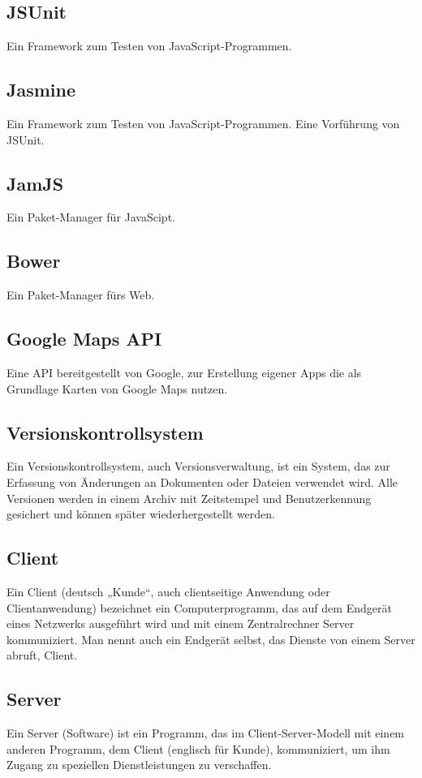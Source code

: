 \documentclass[11pt,a4paper]{article}
\begin{document}
\subsection{JSUnit} Ein Framework zum Testen von JavaScript-Programmen.

\subsection{Jasmine} Ein Framework zum Testen von JavaScript-Programmen. Eine Vorführung von JSUnit.

\subsection{JamJS}
Ein Paket-Manager für JavaScipt.

\subsection{Bower}
Ein Paket-Manager fürs Web.


\subsection{Google Maps API}
Eine API bereitgestellt von Google, zur Erstellung eigener Apps die als Grundlage Karten von Google Maps nutzen.


\subsection{Versionskontrollsystem}
Ein Versionskontrollsystem, auch Versionsverwaltung, ist ein System, das zur Erfassung von Änderungen an Dokumenten oder Dateien verwendet wird. Alle Versionen werden in einem Archiv mit Zeitstempel und Benutzerkennung gesichert und können später wiederhergestellt werden.

\subsection{Client}
Ein Client (deutsch „Kunde“, auch clientseitige Anwendung oder Clientanwendung) bezeichnet ein Computerprogramm, das auf dem Endgerät eines Netzwerks ausgeführt wird und mit einem Zentralrechner Server kommuniziert. Man nennt auch ein Endgerät selbst, das Dienste von einem Server abruft, Client.

\subsection{Server}
Ein Server (Software) ist ein Programm, das im Client-Server-Modell mit einem anderen Programm, dem Client (englisch für Kunde), kommuniziert, um ihm Zugang zu speziellen Dienstleistungen zu verschaffen. \par\bigskip
\end{document}
